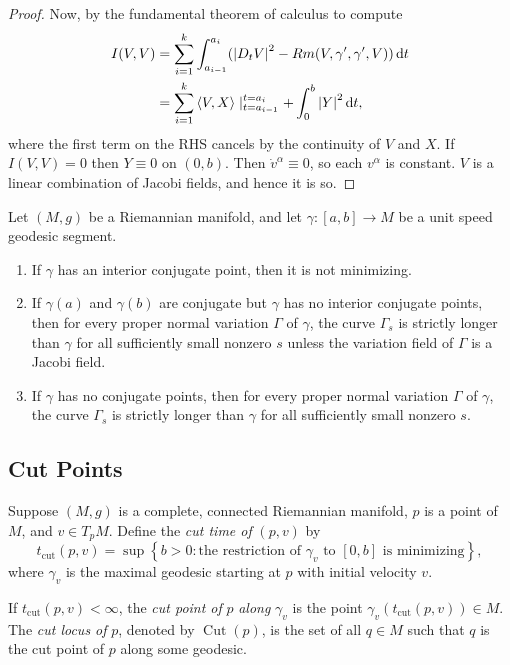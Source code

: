 \begin{proof}
  Now, by the fundamental theorem of calculus to compute
  \begin{align*}
    I(V, V) &= \sum_{i = 1}^k \int_{a_{i - 1}}^{a_i} (\left\lvert D_t V \right\rvert^2 - Rm(V, \gamma', \gamma', V)) \mathop{}\!\mathrm{d} t\\
            &= \sum_{i = 1}^k \left\langle V, X \right\rangle \mid^{t = a_i}_{t = a_{i - 1}} + \int_0^b \left\lvert Y \right\rvert^2 \mathop{}\!\mathrm{d} t,
  \end{align*}
  where the first term on the RHS cancels by the continuity of \( V \) and \( X \).
  If \( I(V, V) = 0 \) then \( Y \equiv 0 \) on \( (0, b) \).
  Then \( \dot{v}^\alpha \equiv 0 \), so each \( v^\alpha \) is constant.
  \( V \) is a linear combination of Jacobi fields, and hence it is so.
\end{proof}

\begin{corollary}
  \label{corollary-summary-index-form}
  Let \( (M, g) \) be a Riemannian manifold, and let \( \gamma: [a, b] \to M \) be a unit speed geodesic segment.
  \begin{enumerate}
    \item If \( \gamma \) has an interior conjugate point, then it is not minimizing.
    \item If \( \gamma(a) \) and \( \gamma(b) \) are conjugate but \( \gamma \) has no interior conjugate points, then for every proper normal variation \( \Gamma \) of \( \gamma \), the curve \( \Gamma_s \) is strictly longer than \( \gamma \) for all sufficiently small nonzero \( s \) unless the variation field of \( \Gamma \) is a Jacobi field.
    \item If \( \gamma \) has no conjugate points, then for every proper normal variation \( \Gamma \) of \( \gamma \), the curve \( \Gamma_s \) is strictly longer than \( \gamma \) for all sufficiently small nonzero \( s \).
  \end{enumerate}
\end{corollary}

\subsection{Cut Points}
\label{subsection-cut-points}

\begin{definition}
  \label{definition-cut-time}
  \label{definition-cut-point}
  \label{definition-cut-locus}
  Suppose \( (M, g) \) is a complete, connected Riemannian manifold, \( p \) is a point of \( M \), and \( v \in T_p M \).
  Define the \emph{cut time of} \( (p, v) \) by
  \[
    t_{\text{cut}}(p, v) = \sup \left\lbrace b > 0: \text{the restriction of } \gamma_v \text{ to } [0, b] \text{ is minimizing} \right\rbrace,
  \]
  where \( \gamma_v  \) is the maximal geodesic starting at \( p \) with initial velocity \( v \).

  If \( t_{\text{cut}}(p, v) < \infty \), the \emph{cut point of} \( p \) \emph{along} \( \gamma_v \) is the point \( \gamma_v(t_{\text{cut}}(p, v)) \in M \).
  The \emph{cut locus of} \( p \), denoted by \( \operatorname{Cut}(p) \), is the set of all \( q \in M \) such that \( q \) is the cut point of \( p \) along some geodesic.
\end{definition}

